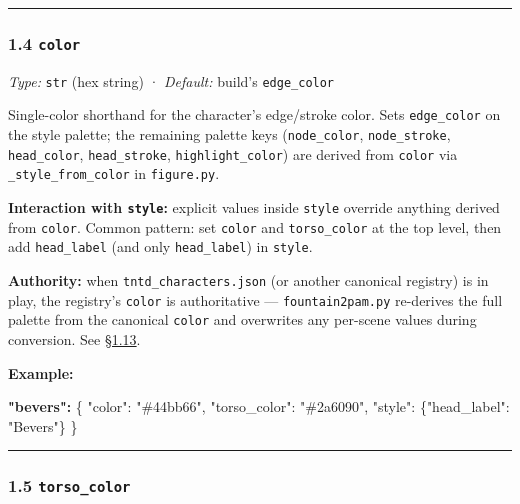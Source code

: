\documentclass[
  11pt,
]{book}
\newenvironment{Shaded}{}{}
\newcommand{\DataTypeTok}[1]{\textcolor[rgb]{0.56,0.13,0.00}{#1}}
\newcommand{\ErrorTok}[1]{\textcolor[rgb]{1.00,0.00,0.00}{\textbf{#1}}}
\newcommand{\FunctionTok}[1]{\textcolor[rgb]{0.02,0.16,0.49}{#1}}
\newcommand{\StringTok}[1]{\textcolor[rgb]{0.25,0.44,0.63}{#1}}
\begin{document}
\begin{center}\rule{0.5\linewidth}{0.5pt}\end{center}

\subsubsection{\texorpdfstring{1.4
\texttt{color}}{1.4 color}}\label{color}

\emph{Type:} \texttt{str} (hex string) · \emph{Default:} build's
\texttt{edge\_color}

Single-color shorthand for the character's edge/stroke color. Sets
\texttt{edge\_color} on the style palette; the remaining palette keys
(\texttt{node\_color}, \texttt{node\_stroke}, \texttt{head\_color},
\texttt{head\_stroke}, \texttt{highlight\_color}) are derived from
\texttt{color} via \texttt{\_style\_from\_color} in \texttt{figure.py}.

\textbf{Interaction with \texttt{style}:} explicit values inside
\texttt{style} override anything derived from \texttt{color}. Common
pattern: set \texttt{color} and \texttt{torso\_color} at the top level,
then add \texttt{head\_label} (and only \texttt{head\_label}) in
\texttt{style}.

\textbf{Authority:} when \texttt{tntd\_characters.json} (or another
canonical registry) is in play, the registry's \texttt{color} is
authoritative --- \texttt{fountain2pam.py} re-derives the full palette
from the canonical \texttt{color} and overwrites any per-scene values
during conversion. See
\hyperref[113-field-precedence-and-the-canonical-registry]{§1.13}.

\textbf{Example:}

\begin{Shaded}
\begin{Highlighting}[]
\ErrorTok{"bevers":} \FunctionTok{\{}
  \DataTypeTok{"color"}\FunctionTok{:} \StringTok{"\#44bb66"}\FunctionTok{,}
  \DataTypeTok{"torso\_color"}\FunctionTok{:} \StringTok{"\#2a6090"}\FunctionTok{,}
  \DataTypeTok{"style"}\FunctionTok{:} \FunctionTok{\{}\DataTypeTok{"head\_label"}\FunctionTok{:} \StringTok{"Bevers"}\FunctionTok{\}}
\FunctionTok{\}}
\end{Highlighting}
\end{Shaded}

\begin{center}\rule{0.5\linewidth}{0.5pt}\end{center}

\subsubsection{\texorpdfstring{1.5
\texttt{torso\_color}}{1.5 torso\_color}}\label{torso_color}
\end{document}
